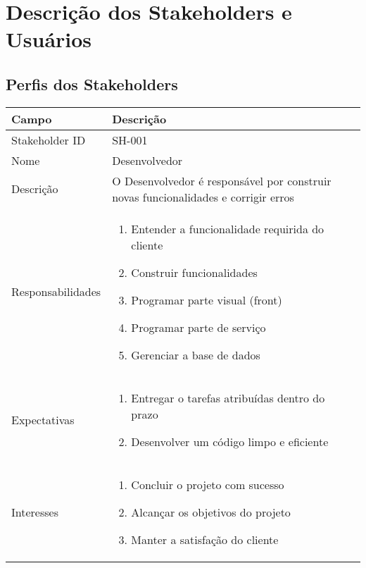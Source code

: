 \chapter{Descrição dos Stakeholders e Usuários}

\section{Perfis dos Stakeholders}

\begin{tabularx}{\textwidth}{| l | X |}
    \hline
    Campo             & Descrição                                                                                                                                                                           \\ \hline
    
    Stakeholder ID    & SH-001                                                                                                                                                                              \\ \hline
    
    Nome              & Desenvolvedor                                                                                                                                                                       \\ \hline
    
    Descrição         & O Desenvolvedor é responsável por construir novas funcionalidades e corrigir erros
    \\ \hline
  
    Responsabilidades & 
    \begin{enumerate}
        \item Entender a funcionalidade requirida do cliente
        \item Construir funcionalidades
        \item Programar parte visual (\Gls{front})
        \item Programar parte de serviço
        \item Gerenciar a base de dados
    \end{enumerate}

    \\ \hline
    Expectativas      & 
    \begin{enumerate}
        \item Entregar o tarefas atribuídas dentro do prazo
        \item Desenvolver um código limpo e eficiente
    \end{enumerate}
    
    \\ \hline
    Interesses        & 
    \begin{enumerate}
        \item Concluir o projeto com sucesso
        \item Alcançar os objetivos do projeto
        \item Manter a satisfação do cliente
    \end{enumerate}

    \\ \hline    
\end{tabularx}

